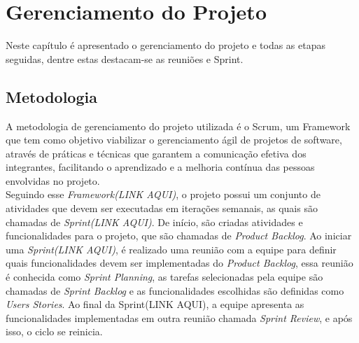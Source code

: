 \chapter{Gerenciamento do Projeto}
Neste capítulo é apresentado o gerenciamento do projeto e todas as etapas seguidas, dentre estas destacam-se as reuniões e Sprint.
\\

\section{Metodologia}
A metodologia de gerenciamento do projeto utilizada é o Scrum, um Framework que tem como objetivo viabilizar o gerenciamento ágil de projetos de software, através de práticas e técnicas que garantem a comunicação efetiva dos integrantes, facilitando o aprendizado e a melhoria contínua das pessoas envolvidas no projeto. \\
Seguindo esse \textit{Framework(LINK AQUI)}, o projeto possui um conjunto de atividades que devem ser executadas em iterações semanais, as quais são chamadas de \textit{Sprint(LINK AQUI)}. De início, são criadas atividades e funcionalidades para o projeto, que são chamadas de \textit{Product Backlog}. Ao iniciar uma \textit{Sprint(LINK AQUI)}, é realizado uma reunião com a equipe para definir quais funcionalidades devem ser implementadas do \textit{Product Backlog}, essa reunião é conhecida como\textit{ Sprint Planning}, as tarefas selecionadas pela equipe são chamadas de \textit{Sprint Backlog} e as funcionalidades escolhidas são definidas como \textit{Users Stories}. Ao final da Sprint(LINK AQUI), a equipe apresenta as funcionalidades implementadas em outra reunião chamada \textit{Sprint Review}, e após isso, o ciclo se reinicia.
\\

